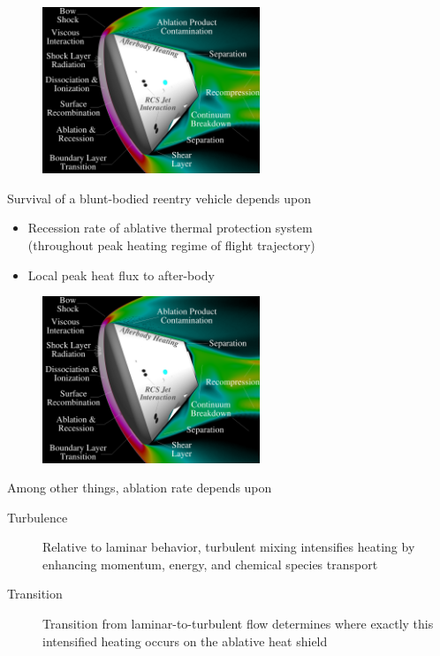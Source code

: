 \documentclass[mathserif]{beamer}
\begin{document}
\begin{frame}
\begin{figure}[h]
  \includegraphics[width=0.58\textwidth]{Capsule_image_updated}
\end{figure}
  \begin{block}{Survival of a blunt-bodied reentry vehicle depends upon}
    \small
    \begin{itemize}
    \item Recession rate of ablative thermal protection system\\
          (throughout peak heating regime of flight trajectory)
    \item Local peak heat flux to after-body
    \end{itemize}
  \end{block}
\end{frame}

\begin{frame}
\begin{figure}[h]
  \includegraphics[width=0.58\textwidth]{Capsule_image_updated}
\end{figure}
\begin{block}{Among other things, ablation rate depends upon}
  \small
  \begin{description}
  \item[Turbulence] Relative to laminar behavior, turbulent mixing
                    intensifies heating by enhancing momentum,
                    energy, and chemical species
                    transport
  \item[Transition] Transition from laminar-to-turbulent flow
                    determines where exactly this intensified heating
                    occurs on the ablative heat shield
  \end{description}
\end{block}
\end{frame}
\end{document}
